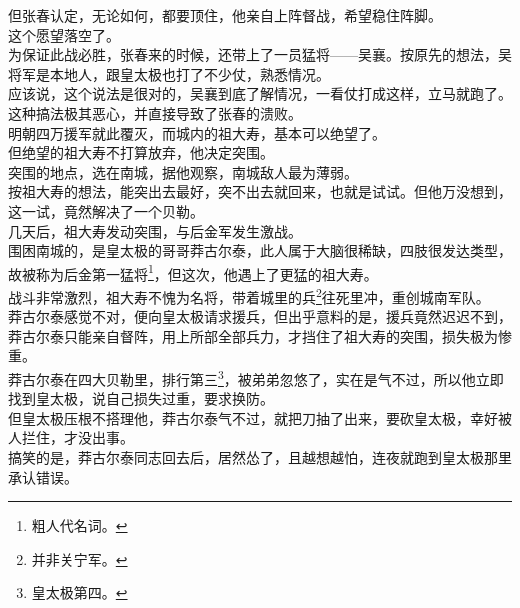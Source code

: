 \begin{multicols}{\theparacolNo}
但张春认定，无论如何，都要顶住，他亲自上阵督战，希望稳住阵脚。\\

这个愿望落空了。\\

为保证此战必胜，张春来的时候，还带上了一员猛将——吴襄。按原先的想法，吴将军是本地人，跟皇太极也打了不少仗，熟悉情况。\\

应该说，这个说法是很对的，吴襄到底了解情况，一看仗打成这样，立马就跑了。\\

这种搞法极其恶心，并直接导致了张春的溃败。\\

明朝四万援军就此覆灭，而城内的祖大寿，基本可以绝望了。\\

但绝望的祖大寿不打算放弃，他决定突围。\\

突围的地点，选在南城，据他观察，南城敌人最为薄弱。\\

按祖大寿的想法，能突出去最好，突不出去就回来，也就是试试。但他万没想到，这一试，竟然解决了一个贝勒。\\

几天后，祖大寿发动突围，与后金军发生激战。\\

围困南城的，是皇太极的哥哥莽古尔泰，此人属于大脑很稀缺，四肢很发达类型，故被称为后金第一猛将\footnote{粗人代名词。}，但这次，他遇上了更猛的祖大寿。\\

战斗非常激烈，祖大寿不愧为名将，带着城里的兵\footnote{并非关宁军。}往死里冲，重创城南军队。\\

莽古尔泰感觉不对，便向皇太极请求援兵，但出乎意料的是，援兵竟然迟迟不到，莽古尔泰只能亲自督阵，用上所部全部兵力，才挡住了祖大寿的突围，损失极为惨重。\\

莽古尔泰在四大贝勒里，排行第三\footnote{皇太极第四。}，被弟弟忽悠了，实在是气不过，所以他立即找到皇太极，说自己损失过重，要求换防。\\

但皇太极压根不搭理他，莽古尔泰气不过，就把刀抽了出来，要砍皇太极，幸好被人拦住，才没出事。\\

搞笑的是，莽古尔泰同志回去后，居然怂了，且越想越怕，连夜就跑到皇太极那里承认错误。\\


\end{multicols}
